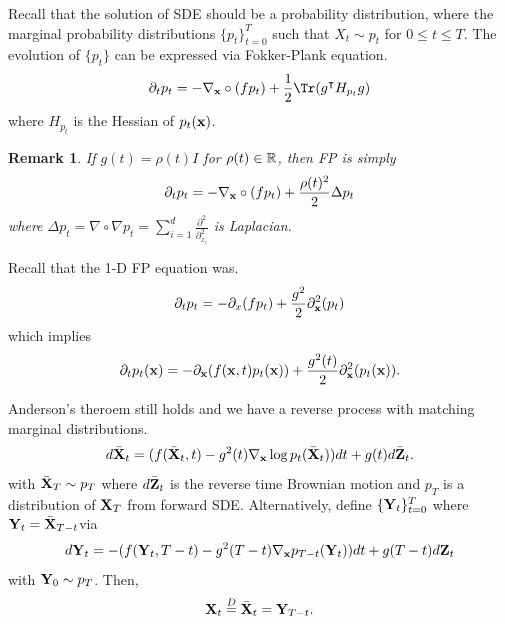 \documentclass[11pt, a4paper]{article}
\newtheorem{remark}{Remark}
\begin{document}
Recall that the solution of SDE should be a probability distribution,
where the marginal probability distributions $\{p_t\}_{t=0}^T$ such that $X_t\sim p_t$ for $0\leq t\leq T$.
The evolution of $\{p_t\}$ can be expressed via Fokker-Plank equation.
\begin{align}
    \partial_t p_t = -\nabla_{\bx}\circ(fp_t) + \frac{1}{2} \Tr(g^\intercal H_{p_t} g)
\end{align}
where $H_{p_t}$ is the Hessian of $p_t({\bf x})$.

\begin{remark}
    If $g(t) = \rho(t) I$ for $\rho(t)\in\mathbb{R}$, then FP is simply 
    \begin{align}
        \partial_t p_t = -\nabla_{{\bf x}}\circ(fp_t) + \frac{\rho(t)^2}{2} \Delta p_t
    \end{align}
    where $\Delta p_t = \nabla\circ \nabla p_t = \sum_{i=1}^d \frac{\partial^2}{\partial_{x_i}^2}$ is Laplacian.
\end{remark}

Recall that the 1-D FP equation was.
\begin{align}
    \partial_t p_t = -\partial_x(fp_t) + \frac{g^2}{2}\partial_{\bf x}^2 (p_t)
\end{align}
which implies
\begin{align}
    \partial_t p_t({\bf x}) = -\partial_{\bf x}(f({\bf x}, t)p_t({\bf x})) + \frac{g^2(t)}{2}\partial_{\bf x}^2 (p_t({\bf x})).
\end{align}

Anderson's theroem still holds and we have a reverse process with matching marginal distributions.
\begin{align}
    d\bar{{\bf X}}_t = (f(\bar{{\bf X}}_t, t) - g^2(t) \nabla_{\bf x}\log p_t(\bar{{\bf X}}_t))dt+g(t) d\bar{{\bf Z}}_t.
\end{align}
with $\bar{{\bf X}}_T\sim p_T$ where $d\bar{{\bf Z}}_t$ is the reverse time Brownian motion and $p_T$ is a distribution of ${\bf X}_T$ from forward SDE.
Alternatively, define $\{{\bf Y}_t\}_{t=0}^T$ where ${\bf Y}_t= \bar{{\bf X}}_{T-t}$via
\begin{align}
    d{\bf Y}_t =  - (f({\bf Y}_t, T-t) - g^2(T-t)\nabla_{\bf x} p_{T-t}({\bf Y}_t))dt + g(T-t)d{\bf Z}_t
\end{align}
with ${\bf Y}_0\sim p_T$.
Then,
\begin{align}
    {\bf X}_t \stackrel{D}{=} \bar{{\bf X}}_t ={\bf Y}_{T-t}.
\end{align}




\end{document}
